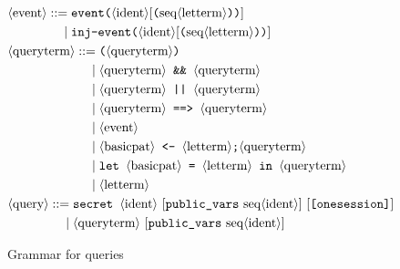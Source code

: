 \begin{figure}
\def\phq{\phantom{\nonterm{query} = }\mid}
\def\phqt{\phantom{\nonterm{queryterm} = }\mid}
\begin{align*}
&\nonterm{event} ::= \texttt{event(}\nonterm{ident}[\texttt{(}\seq{letterm}\texttt{))}]\\
&\phantom{\nonterm{event} =}\mid \texttt{inj-event(}\nonterm{ident}[\texttt{(}\seq{letterm}\texttt{))}]\\
&\nonterm{queryterm} ::= \texttt{(}\nonterm{queryterm}\texttt{)}\\
&\phqt \nonterm{queryterm}\texttt{ \&\& }\nonterm{queryterm}\\
&\phqt \nonterm{queryterm}\texttt{ || }\nonterm{queryterm}\\
&\phqt \nonterm{queryterm}\texttt{ ==> }\nonterm{queryterm}\\
&\phqt \nonterm{event}\\
&\phqt \nonterm{basicpat} \texttt{ <- } \nonterm{letterm}\texttt{;}\nonterm{queryterm}\\
&\phqt \texttt{let } \nonterm{basicpat} \texttt{ = }\nonterm{letterm}\texttt{ in }\nonterm{queryterm}\\
&\phqt \nonterm{letterm}\\
&\nonterm{query} ::= \texttt{secret }\nonterm{ident}\ [\texttt{public\_vars}\ \seq{ident}]\ [\texttt{[onesession]}]\\
&\phq \nonterm{queryterm}\ [\texttt{public\_vars}\ \seq{ident}]
\end{align*}
\caption{Grammar for queries}
\label{fig:syntax1.5}
\end{figure}

